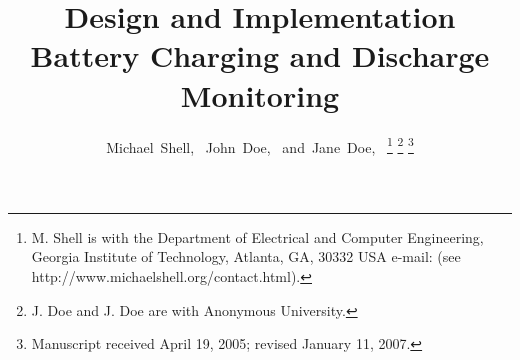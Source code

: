 \documentclass[journal]{IEEEtran}
\begin{document}
			      \title{Design and Implementation Battery Charging and Discharge Monitoring }

			      \author{Michael~Shell,~
			              John~Doe,~
				              and~Jane~Doe,~%
					      \thanks{M. Shell is with the Department
					      of Electrical and Computer Engineering, Georgia Institute of Technology, Atlanta,
					      GA, 30332 USA e-mail: (see http://www.michaelshell.org/contact.html).}%
					      \thanks{J. Doe and J. Doe are with Anonymous University.}%
					      \thanks{Manuscript received April 19, 2005; revised January 11, 2007.}}

\end{document}
